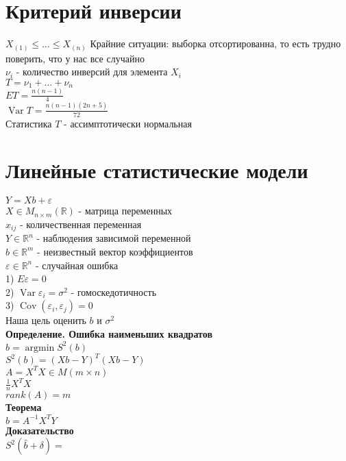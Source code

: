 \documentclass{article}
\newcommand\0{\mathbb{0}}
\DeclareMathOperator{\Var}{Var}
\DeclareMathOperator{\Cov}{Cov}
\DeclareMathOperator{\argmin}{argmin}
\newcommand\1{\mathbb{1}}
\renewcommand{\bf}{\textbf}
\begin{document}
\section{Критерий инверсии}
$X_{(1)} \leq \dots \leq X_{(n)}$
Крайние ситуации: выборка отсортированна, то есть трудно поверить, что у нас все случайно\\
$\nu_i$ - количество инверсий для элемента $X_i$\\
$T = \nu_1 + \dots + \nu_{n}$\\
$ET = \frac{n(n - 1)}{4}$\\
$\Var T = \frac{n(n - 1)(2n + 5)}{72}$\\
Статистика $T$ - ассимптотически нормальная\\
\section{Линейные статистические модели}
$Y = Xb + \varepsilon$\\
$X \in M_{n \times m}(\mathbb{R})$ - матрица переменных\\
$x_{ij}$ - количественная переменная\\
$Y \in \mathbb{R}^n$ - наблюдения зависимой переменной\\
$b \in \mathbb{R}^m$ - неизвестный вектор коэффициентов\\
$\varepsilon \in \mathbb{R}^n$ - случайная ошибка\\
1) $E\varepsilon = 0$\\
2) $\Var \varepsilon_i = \sigma^2$ - гомоскедотичность\\
3) $\Cov(\varepsilon_i, \varepsilon_j) = 0$\\
Наша цель оценить $b$ и $\sigma^2$\\
\bf{Определение. Ошибка наименьших квадратов}\\
$\widehat{b} = \argmin S^2(b)$\\
$S^2(b) = (Xb - Y)^T(Xb - Y)$\\
$A = X^T X \in M(m \times n)$\\
$\frac{1}{n}X^T X$\\
$rank(A) = m$\\
\bf{Теорема}\\
$\widehat{b} = A^{-1}X^T Y$\\
\bf{Доказательство}\\
$S^2(\widehat{b} + \delta) = $ %
\end{document}
